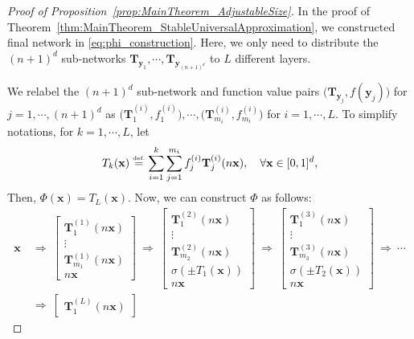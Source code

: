 \documentclass{article}
\numberwithin{equation}{section}
\theoremstyle{definition}
\newcommand{\eqdef}{\ensuremath{\stackrel{\mbox{\upshape\tiny def.}}{=}}}
\begin{document}
\begin{proof}[Proof of Proposition~\ref{prop:MainTheorem_AdjustableSize}]
In the proof of Theorem~\ref{thm:MainTheorem_StableUniversalApproximation}, we constructed final network in \eqref{eq:phi_construction}. Here, we only need to distribute the $(n+1)^d$ sub-networks $\mathbf{T}_{\mathbf{y}_1}, \cdots, \mathbf{T}_{\mathbf{y}_{(n+1)^d}}$ to $L$ different layers.

We relabel the $(n+1)^d$ sub-network and function value pairs $\big(\mathbf{T}_{\mathbf{y}_j}, f(\mathbf{y}_j)\big)$ for $j=1,\cdots,(n+1)^d$ as $\big(\mathbf{T}_1^{(i)}, f_1^{(i)}\big), \cdots, \big(\mathbf{T}_{m_i}^{(i)}, f_{m_i}^{(i)}\big)$ for $i=1,\cdots,L$. To simplify notations, for $k=1,\cdots,L$, let
\[
    T_k (\mathbf{x})
    \eqdef
    \sum_{i=1}^k
    \sum_{j=1}^{m_i}
    f_j^{(i)} \mathbf{T}_j^{(i)}(n\mathbf{x}),
    \quad
    \forall \mathbf{x} \in [0,1]^d,
\]
Then, $\Phi(\mathbf{x}) = T_L(\mathbf{x})$. Now, we can construct $\Phi$ as follows:
\begin{align*}
    \mathbf{x}
    \ &\Longrightarrow \
    \begin{bmatrix} 
    \mathbf{T}_1^{(1)}(n\mathbf{x})
    \\ 
    \vdots
    \\
    \mathbf{T}_{m_1}^{(1)}(n\mathbf{x})
    \\
    n\mathbf{x}
    \end{bmatrix}
    \ \Longrightarrow \
    \begin{bmatrix} 
    \mathbf{T}_1^{(2)}(n\mathbf{x})
    \\ 
    \vdots
    \\
    \mathbf{T}_{m_2}^{(2)}(n\mathbf{x})
    \\
    \sigma(\pm T_1 (\mathbf{x}))
    \\
    n\mathbf{x}
    \end{bmatrix}
    \ \Longrightarrow \
    \begin{bmatrix} 
    \mathbf{T}_1^{(3)}(n\mathbf{x})
    \\ 
    \vdots
    \\
    \mathbf{T}_{m_3}^{(3)}(n\mathbf{x})
    \\
    \sigma(\pm T_2 (\mathbf{x}))
    \\
    n\mathbf{x}
    \end{bmatrix}
    \ \Longrightarrow \
    \cdots
    \\
    \ &\Longrightarrow \
    \begin{bmatrix} 
    \mathbf{T}_1^{(L)}(n\mathbf{x})

\end{bmatrix}
\end{align*}
\end{proof}
\end{document}
